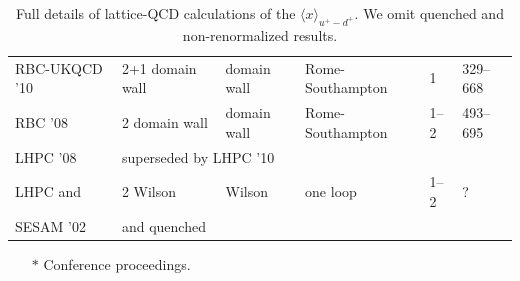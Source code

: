 \begin{table}[t]
{\begin{tabular}{llllll}
  RBC-UKQCD '10 \cite{Aoki:2010xg} &
  2+1 domain wall & domain wall & Rome-Southampton & 1 & 329--668 \\

  RBC '08 \cite{Lin:2008uz} &
  2 domain wall & domain wall & Rome-Southampton & 1--2 & 493--695 \\

  LHPC '08 \cite{Hagler:2007xi} &
  \multicolumn{5}{l}{superseded by LHPC '10} \\

  LHPC and &
  2 Wilson & Wilson & one loop & 1--2 & ?\\
  SESAM '02 \cite{Dolgov:2002zm} &
  and quenched & & & \\
\hline
\end{tabular}
} %
\begin{minipage}{\linewidth}
{\footnotesize 
\begin{itemize}
\item[$*$] Conference proceedings.
\end{itemize}
}
\end{minipage}
\caption{\small Full details of lattice-QCD calculations of the $\langle x\rangle_{u^+-d^+}$. We omit quenched and non-renormalized results.
\label{tab:unpolarizedisotriplet}
}
\end{table}


